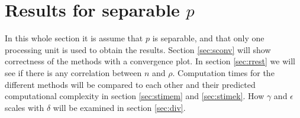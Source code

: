 \chapter{Results for separable $p$} \label{sec:seri}%
In this whole section it is assume that $p$ is separable, and that only one processing unit is used to obtain the results. 
Section \ref{sec:sconv} will show correctness of the methods with a convergence plot. In section \ref{sec:rrest} we will see if there is any correlation between $n$ and $\rho$.
Computation times for the different methods will be compared to each other and their predicted computational complexity in section \ref{sec:stimem} and \ref{sec:stimek}.
How $\gamma$ and $\epsilon$ scales with $\delta$ will be examined in section \ref{sec:div}.
